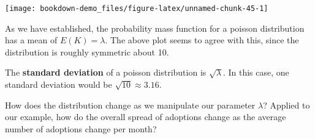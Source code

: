 \documentclass[
]{book}
\newenvironment{Shaded}{\begin{snugshade}}{\end{snugshade}}
\newcommand{\AttributeTok}[1]{\textcolor[rgb]{0.77,0.63,0.00}{#1}}
\newcommand{\DecValTok}[1]{\textcolor[rgb]{0.00,0.00,0.81}{#1}}
\newcommand{\FloatTok}[1]{\textcolor[rgb]{0.00,0.00,0.81}{#1}}
\newcommand{\FunctionTok}[1]{\textcolor[rgb]{0.00,0.00,0.00}{#1}}
\newcommand{\NormalTok}[1]{#1}
\newcommand{\OtherTok}[1]{\textcolor[rgb]{0.56,0.35,0.01}{#1}}
\newcommand{\SpecialCharTok}[1]{\textcolor[rgb]{0.00,0.00,0.00}{#1}}
\newcommand{\StringTok}[1]{\textcolor[rgb]{0.31,0.60,0.02}{#1}}
\begin{document}
\begin{Shaded}
\end{Shaded}

\begin{center}\texttt{[image: bookdown-demo\_files/figure-latex/unnamed-chunk-45-1]} \end{center}

As we have established, the probability mass function for a poisson distribution has a mean of \(E(K) = \lambda\). The above plot seems to agree with this, since the distribution is roughly symmetric about 10.

The \textbf{standard deviation} of a poisson distribution is \(\sqrt{\lambda}\). In this case, one standard deviation would be \(\sqrt{10}\approx3.16\).

How does the distribution change as we manipulate our parameter \(\lambda\)? Applied to our example, how do the overall spread of adoptions change as the average number of adoptions change per month?
\end{document}
